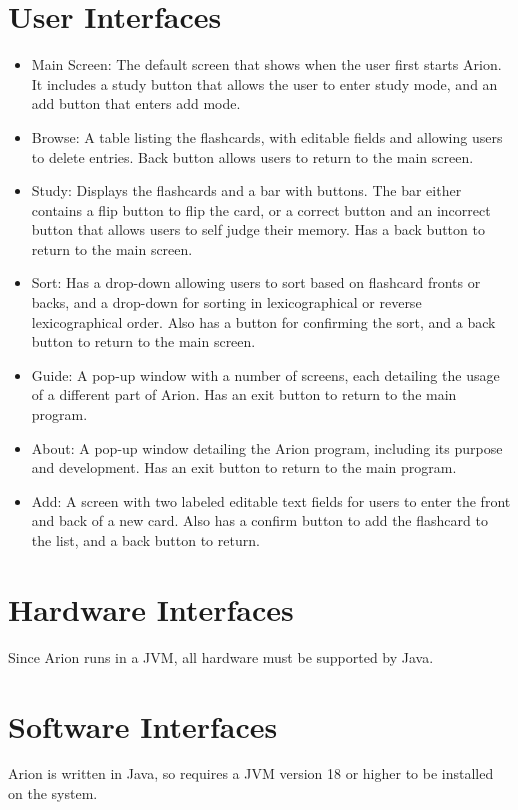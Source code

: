 \documentclass{scrreprt}
\begin{document}
\section{User Interfaces}
\begin{itemize}
    \item
        Main Screen: The default screen that shows when the user first starts Arion.
        It includes a study button that allows the user to enter study mode,
        and an add button that enters add mode.
    \item 
        Browse: A table listing the flashcards, with editable fields and allowing users to 
        delete entries. Back button allows users to return to the main screen.
    \item
        Study: Displays the flashcards and a bar with buttons. The bar either contains a 
        flip button to flip the card, or a correct button and an incorrect button that
        allows users to self judge their memory. Has a back button to return to 
        the main screen.
    \item 
        Sort: Has a drop-down allowing users to sort based on flashcard fronts or backs,
        and a drop-down for sorting in lexicographical or reverse lexicographical order. 
        Also has a button for confirming the sort, and a back button to return to the main screen.
    \item 
        Guide: A pop-up window with a number of screens, each detailing the usage of a
        different part of Arion. Has an exit button to return to the main program.
    \item 
        About: A pop-up window detailing the Arion program, including its purpose and development.
        Has an exit button to return to the main program.
    \item 
        Add: A screen with two labeled editable text fields for users to enter the front and
        back of a new card. Also has a confirm button to add the flashcard to the list, and
        a back button to return.
\end{itemize}

\section{Hardware Interfaces}
Since Arion runs in a JVM, all hardware must be supported by Java.

\section{Software Interfaces}
Arion is written in Java, so requires a JVM version 18 or higher to be installed on the system.
\end{document}

